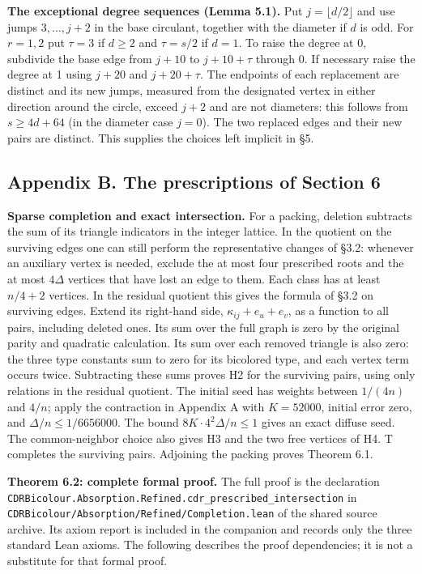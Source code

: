 \documentclass[english,11pt,a4paper]{article}
\begin{document}
\textbf{The exceptional degree sequences (Lemma 5.1).} Put \(j=\lfloor d/2\rfloor\) and use jumps \(3,\ldots,j+2\) in the base circulant, together with the diameter if \(d\) is odd. For \(r=1,2\) put \(\tau=3\) if \(d\ge2\) and \(\tau=s/2\) if \(d=1\). To raise the degree at 0, subdivide the base edge from \(j+10\) to \(j+10+\tau\) through 0. If necessary raise the degree at 1 using \(j+20\) and \(j+20+\tau\). The endpoints of each replacement are distinct and its new jumps, measured from the designated vertex in either direction around the circle, exceed \(j+2\) and are not diameters: this follows from \(s\ge4d+64\) (in the diameter case \(j=0\)). The two replaced edges and their new pairs are distinct. This supplies the choices left implicit in §5.

\subsection{Appendix B. The prescriptions of Section 6}\label{appendix-b.-the-prescriptions-of-section-6}

\textbf{Sparse completion and exact intersection.} For a packing, deletion subtracts the sum of its triangle indicators in the integer lattice. In the quotient on the surviving edges one can still perform the representative changes of §3.2: whenever an auxiliary vertex is needed, exclude the at most four prescribed roots and the at most \(4\Delta\) vertices that have lost an edge to them. Each class has at least \(n/4+2\) vertices. In the residual quotient this gives the formula of §3.2 on surviving edges. Extend its right-hand side, \(\kappa_{ij}+e_u+e_v\), as a function to all pairs, including deleted ones. Its sum over the full graph is zero by the original parity and quadratic calculation. Its sum over each removed triangle is also zero: the three type constants sum to zero for its bicolored type, and each vertex term occurs twice. Subtracting these sums proves H2 for the surviving pairs, using only relations in the residual quotient. The initial seed has weights between \(1/(4n)\) and \(4/n\); apply the contraction in Appendix A with \(K=52000\), initial error zero, and \(\Delta/n\le1/6656000\). The bound \(8K\cdot4^2\Delta/n\le1\) gives an exact diffuse seed. The common-neighbor choice also gives H3 and the two free vertices of H4. T completes the surviving pairs. Adjoining the packing proves Theorem 6.1.

\textbf{Theorem 6.2: complete formal proof.} The full proof is the declaration \texttt{CDRBicolour.\allowbreak{}Absorption.\allowbreak{}Refined.\allowbreak{}cdr\_\allowbreak{}prescribed\_\allowbreak{}intersection} in \texttt{CDRBicolour/\allowbreak{}Absorption/\allowbreak{}Refined/\allowbreak{}Completion.\allowbreak{}lean} of the shared source archive. Its axiom report is included in the companion and records only the three standard Lean axioms. The following describes the proof dependencies; it is not a substitute for that formal proof.
\end{document}
